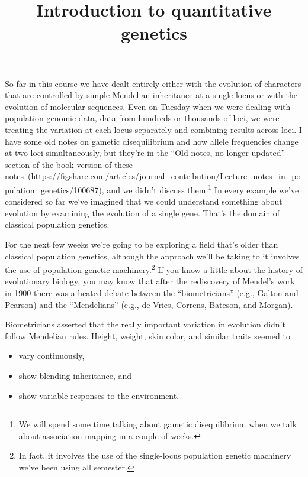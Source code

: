 \documentclass[12pt]{article}
\title{Introduction to quantitative genetics}
\begin{document}
\maketitle

\thispagestyle{first}

So far in this course we have dealt entirely either with the evolution
of characters that are controlled by simple Mendelian inheritance at a
single locus or with the evolution of molecular sequences. Even on
Tuesday when we were dealing with population genomic data, data from
hundreds or thousands of loci, we were treating the variation at each
locus separately and combining results across loci. I have some old
notes on gametic disequilibrium and how allele frequencies change at
two loci simultaneously, but they're in the ``Old notes, no longer
updated'' section of the book version of these
notes~(\url{https://figshare.com/articles/journal_contribution/Lecture_notes_in_population_genetics/100687}),
and we didn't discuss them.\footnote{We will spend some time talking
  about gametic disequilibrium when we talk about association mapping
  in a couple of weeks.} In every example we've considered so far
we've imagined that we could understand something about evolution by
examining the evolution of a single gene. That's the domain of
classical population genetics.

For the next few weeks we're going to be exploring a field that's
older than classical population genetics, although the approach we'll
be taking to it involves the use of population genetic
machinery.\footnote{In fact, it involves the use of the single-locus
  population genetic machinery we've been using all semester.} If you
know a little about the history of evolutionary biology, you may know
that after the rediscovery of Mendel's work in 1900 there was a heated
debate between the ``biometricians'' (e.g., Galton and Pearson) and
the ``Mendelians'' (e.g., de Vries, Correns, Bateson, and
Morgan).

Biometricians asserted that the really important variation in
evolution didn't follow Mendelian rules. Height, weight, skin color,
and similar traits seemed to

\begin{itemize}

\item vary continuously,

\item show blending inheritance, and

\item show variable responses to the environment.

\end{itemize}
\end{document}
